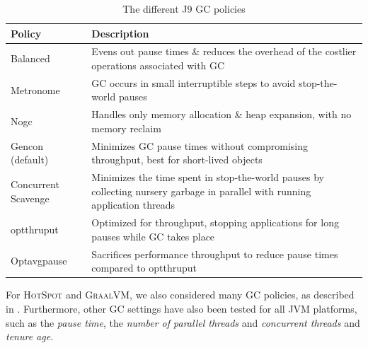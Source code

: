 \begin{table}
    \centering
    \caption{The different \textsc{J9} GC policies}
    \label{table:GCJ9}
    \small
    \begin{tabular}{|p{}|p{}|}
        \hline
        \textbf{Policy}              & \textbf{Description}                                                                                                         \\
        \hline
        \hline
        \textsf{Balanced}            & Evens out pause times \& reduces the overhead of the costlier operations associated with GC                                  \\
        \hline
        \textsf{Metronome}           & GC occurs in small interruptible steps to avoid stop-the-world pauses                                                        \\
        \hline
        \textsf{Nogc}                & Handles only memory allocation \& heap expansion, with no memory reclaim                                                     \\
        \hline
        \textsf{Gencon}\,(default)   & Minimizes GC pause times without compromising throughput, best for short-lived objects                                       \\
        \hline
        \textsf{Concurrent Scavenge} & Minimizes the time spent in stop-the-world pauses by collecting nursery garbage in parallel with running application threads \\
        \hline
        \textsf{optthruput}          & Optimized for throughput, stopping applications for long pauses while GC takes place                                         \\
        \hline
        \textsf{Optavgpause}         & Sacrifices performance throughput to reduce pause times compared to \textsf{optthruput}                                      \\
        \hline
    \end{tabular}
\end{table}

For \textsc{HotSpot} and \textsc{GraalVM}, we also considered many GC policies, as described in .
Furthermore, other GC settings have also been tested for all JVM platforms, such as the \emph{pause time}, the \emph{number of parallel threads} and \emph{concurrent threads} and \emph{tenure age}.

